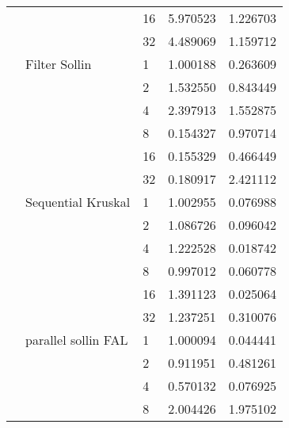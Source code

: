 \begin{tabular}{lllrr}
                                                       &                     & 16 &  5.970523 &  1.226703 \\
                                                       &                     & 32 &  4.489069 &  1.159712 \\
                                                       & Filter Sollin & 1  &  1.000188 &  0.263609 \\
                                                       &                     & 2  &  1.532550 &  0.843449 \\
                                                       &                     & 4  &  2.397913 &  1.552875 \\
                                                       &                     & 8  &  0.154327 &  0.970714 \\
                                                       &                     & 16 &  0.155329 &  0.466449 \\
                                                       &                     & 32 &  0.180917 &  2.421112 \\
                                                       & Sequential Kruskal & 1  &  1.002955 &  0.076988 \\
                                                       &                     & 2  &  1.086726 &  0.096042 \\
                                                       &                     & 4  &  1.222528 &  0.018742 \\
                                                       &                     & 8  &  0.997012 &  0.060778 \\
                                                       &                     & 16 &  1.391123 &  0.025064 \\
                                                       &                     & 32 &  1.237251 &  0.310076 \\
                                                       & parallel sollin FAL & 1  &  1.000094 &  0.044441 \\
                                                       &                     & 2  &  0.911951 &  0.481261 \\
                                                       &                     & 4  &  0.570132 &  0.076925 \\
                                                       &                     & 8  &  2.004426 &  1.975102 \\

\end{tabular}
